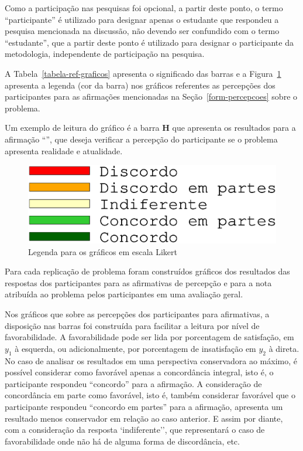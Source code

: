 Como a participação nas pesquisas foi opcional, a partir deste ponto, 
o termo  ``participante'' é utilizado para designar apenas 
o estudante que respondeu a pesquisa mencionada na discussão,
não devendo ser confundido com o termo ``estudante'', que a partir deste ponto
é utilizado para designar o participante da metodologia, independente
de participação na pesquisa.

A Tabela~\ref{tabela-ref-graficos} apresenta o significado das barras
e a Figura~\ref{figura-ref-graficos} apresenta a legenda (cor da barra)
nos gráficos referentes as percepções dos participantes para as
afirmações mencionadas na Seção~\ref{form-percepcoes} sobre
o problema.



Um exemplo de leitura do gráfico é a barra \textbf{H} que apresenta
os resultados para a afirmação ``\LikertPH'', que deseja verificar
a percepção do participante se o problema apresenta realidade
e atualidade.

\begin{figure}[!htb]
\centering
\includegraphics[scale=0.3,trim={0 4cm 0 1.5cm},clip]{figura-ref-graficos.eps}
\caption{Legenda para os gráficos em escala Likert} 
\label{figura-ref-graficos}
\end{figure}

Para cada replicação de problema foram construídos gráficos
dos resultados das respostas dos participantes para as afirmativas
de percepção e para a nota atribuída ao problema pelos
participantes em uma avaliação geral.


Nos gráficos que sobre as percepções dos participantes
para afirmativas, a disposição nas barras
foi construída para facilitar a leitura por nível de favorabilidade.
A favorabilidade pode ser lida por porcentagem de satisfação,
em $y_1$ à esquerda, ou adicionalmente, por porcentagem de
insatisfação em $y_2$ à direta.
No caso de analisar os resultados em uma perspectiva conservadora ao máximo,
é possível considerar como favorável apenas a concordância
integral, isto é, o participante respondeu ``concordo'' para
a afirmação.
A consideração de concordância em parte como favorável,
isto é, também considerar favorável que
o participante respondeu ``concordo em partes'' para a afirmação,
apresenta um resultado menos conservador em relação ao caso anterior.
E assim por diante, com a consideração da resposta `indiferente'', que
representará o caso de favorabilidade onde não há de alguma forma de
discordância, etc.

